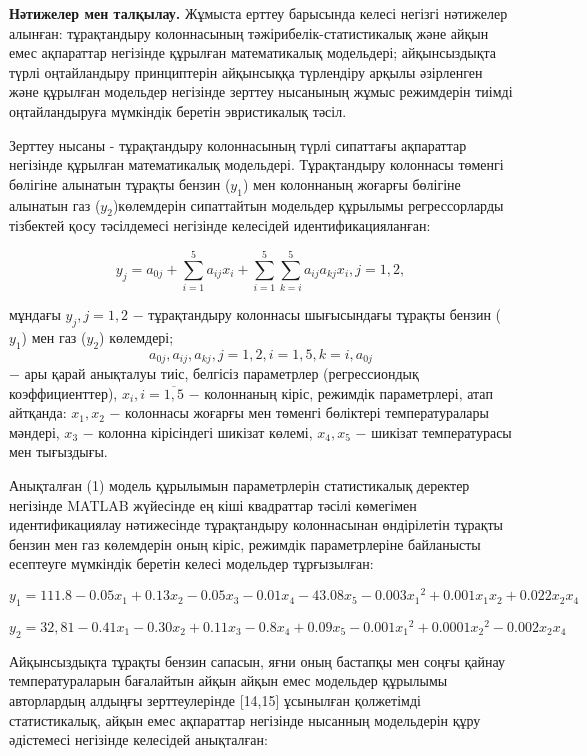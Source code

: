 {\bfseries Нәтижелер мен талқылау.} Жұмыста ерттеу барысында
келесі негізгі нәтижелер алынған: тұрақтандыру колоннасының
тәжірибелік-статистикалық және айқын емес ақпараттар негізінде құрылған
математикалық модельдері; айқынсыздықта түрлі оңтайландыру принциптерін
айқынсыққа түрлендіру арқылы әзірленген және құрылған модельдер
негізінде зерттеу нысанының жұмыс режимдерін тиімді оңтайландыруға
мүмкіндік беретін эвристикалық тәсіл.

Зерттеу нысаны - тұрақтандыру колоннасының түрлі сипаттағы ақпараттар
негізінде құрылған математикалық модельдері. Тұрақтандыру
колоннасы төменгі бөлігіне алынатын тұрақты бензин ($y_1$) мен колоннаның жоғарғы бөлігіне
алынатын газ ($y_2 $)көлемдерін сипаттайтын
модельдер құрылымы регрессорларды тізбектей қосу тәсілдемесі негізінде
келесідей идентификацияланған:

\begin{equation}
	y_j = a_{0j} + \sum_{i=1}^5 {a_{ij}x_{i} + \sum_{i=1}^5\sum_{k=i}^5 {a_{ij}}{a_{kj}x_i, j=1,2,}} 
\end{equation}	

мұндағы $y_j, j=1,2$ − тұрақтандыру колоннасы
шығысындағы тұрақты бензин ($y_1$) мен газ ($y_2$)
көлемдері;
\[a_{0j}, a_{ij}, a_{kj}, j=1,2, i=1,5, k=i, a_{0j} \] −
ары қарай анықталуы тиіс, белгісіз параметрлер (регрессиондық
коэффициенттер), 
 $x_i, i=\overline{1,5}$ − колоннаның кіріс, режимдік параметрлері, атап айтқанда: $x_1, x_2$ − колоннасы
жоғарғы мен төменгі бөліктері температуралары мәндері, $ x_3$ − колонна кірісіндегі
шикізат көлемі, $x_4,x_5$ − шикізат
температурасы мен тығыздығы.

Анықталған (1) модель құрылымын параметрлерін статистикалық деректер
негізінде MATLAB жүйесінде ең кіші квадраттар тәсілі көмегімен
идентификациялау нәтижесінде тұрақтандыру колоннасынан өндірілетін
тұрақты бензин мен газ көлемдерін оның кіріс, режимдік параметрлеріне
байланысты есептеуге мүмкіндік беретін келесі модельдер тұрғызылған:

\begin{equation}
y_1=111.8 - 0.05x_1 +0.13x_2 - 0.05x_3 - 0.01x_4 - 43.08x_5 - 0.003{x_1}^2 +0.001x_1x_2 +0.022x_2x_4 
\end{equation}

\begin{equation}
y_2 = 32,81 - 0.41x_1 - 0.30x_2 +0.11x_3 -0.8x_4 +0.09x_5 - 0.001{x_1}^2 +0.0001{x_2}^2	- 0.002{x_2x_4}
\end{equation}

Айқынсыздықта тұрақты бензин сапасын, яғни оның бастапқы мен соңғы
қайнау температураларын бағалайтын айқын айқын емес модельдер құрылымы
авторлардың алдыңғы зерттеулерінде {[}14,15{]} ұсынылған қолжетімді
статистикалық, айқын емес ақпараттар негізінде нысанның модельдерін құру
әдістемесі негізінде келесідей анықталған:

